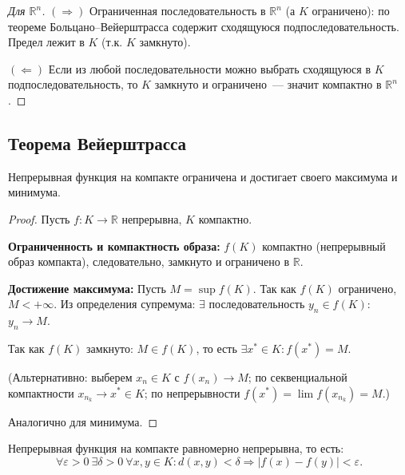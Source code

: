 \documentclass[12pt]{article}
\begin{document}
	\begin{proof}[Для $\mathbb{R}^n$]
		$(\Rightarrow)$ Ограниченная последовательность в $\mathbb{R}^n$ (а $K$ ограничено): по теореме Больцано--Вейерштрасса содержит сходящуюся подпоследовательность. Предел лежит в $K$ (т.к. $K$ замкнуто).
		
		$(\Leftarrow)$ Если из любой последовательности можно выбрать сходящуюся в $K$ подпоследовательность, то $K$ замкнуто и ограничено~--- значит компактно в $\mathbb{R}^n$.
	\end{proof}
	
	\subsection{Теорема Вейерштрасса}
	
	\begin{theorem}[Вейерштрасс]
		Непрерывная функция на компакте ограничена и достигает своего максимума и минимума.
	\end{theorem}
	
	\begin{proof}
		Пусть $f: K \to \mathbb{R}$ непрерывна, $K$ компактно.
		
		\textbf{Ограниченность и компактность образа:} $f(K)$ компактно (непрерывный образ компакта), следовательно, замкнуто и ограничено в $\mathbb{R}$.
		
		\textbf{Достижение максимума:} Пусть $M = \sup f(K)$. Так как $f(K)$ ограничено, $M < +\infty$. Из определения супремума: $\exists$ последовательность $y_n \in f(K)$: $y_n \to M$.
		
		Так как $f(K)$ замкнуто: $M \in f(K)$, то есть $\exists x^* \in K: f(x^*) = M$.
		
		(Альтернативно: выберем $x_n \in K$ с $f(x_n) \to M$; по секвенциальной компактности $x_{n_k} \to x^* \in K$; по непрерывности $f(x^*) = \lim f(x_{n_k}) = M$.)
		
		Аналогично для минимума.
	\end{proof}
	
	\begin{theorem}
		Непрерывная функция на компакте равномерно непрерывна, то есть:
		\[\forall \varepsilon > 0 \ \exists \delta > 0 \ \forall x, y \in K: d(x, y) < \delta \Rightarrow |f(x) - f(y)| < \varepsilon.\]
	\end{theorem}
	
\end{document}
